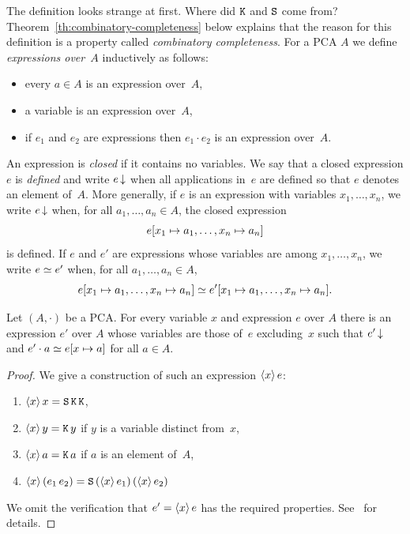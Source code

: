 \noindent
The definition looks strange at first. Where did $\mathtt{K}$ and $\mathtt{S}$
come from? Theorem~\ref{th:combinatory-completeness} below explains
that the reason for this definition is a property called
\emph{combinatory completeness}.
%
For a PCA $A$ we define \emph{expressions over~$A$} inductively as
follows:
%
\begin{itemize}
\item every $a \in A$ is an expression over~$A$,
\item a variable is an expression over~$A$,
\item if $e_1$ and $e_2$ are expressions then $e_1 \cdot e_2$ is an
  expression over~$A$.
\end{itemize}
%
An expression is \emph{closed} if it contains no variables. We say
that a closed expression $e$ is \emph{defined} and write $e\,{\downarrow}$
when all applications in~$e$ are defined so that $e$ denotes an
element of~$A$. More generally, if $e$ is an expression with variables
$x_1, \ldots, x_n$, we write $e\,{\downarrow}$ when, for all $a_1, \ldots,
a_n \in A$, the closed expression
%
\begin{equation*}
  e[x_1 \mapsto a_1, \ldots, x_n \mapsto a_n]
\end{equation*}
%
is defined. If $e$ and $e'$ are expressions whose variables are among
$x_1, \ldots, x_n$, we write $e \simeq e'$ when, for all $a_1, \ldots,
a_n \in A$,
%
\begin{equation*}
  e[x_1 \mapsto a_1, \ldots, x_n \mapsto a_n] \simeq
  e'[x_1 \mapsto a_1, \ldots, x_n \mapsto a_n].
\end{equation*}

\begin{theorem}
  \label{th:combinatory-completeness}
  Let $(A, {\cdot})$ be a PCA. For every variable $x$ and expression
  $e$ over $A$ there is an expression $e'$ over $A$ whose variables
  are those of~$e$ excluding~$x$ such that $e'\,{\downarrow}$ and $e'
  \cdot a \simeq e[x \mapsto a]$ for all $a \in A$.
\end{theorem}

\begin{proof}
  We give a construction of such an expression $\langle x \rangle\,e$:
  \begin{enumerate}
  \item $\langle x \rangle\,x = \mathtt{S}\, \mathtt{K}\, \mathtt{K}$,
  \item $\langle x \rangle\,y = \mathtt{K}\, y$ if $y$ is a variable distinct from~$x$,
  \item $\langle x \rangle\,a = \mathtt{K}\, a$ if $a$ is an element of~$A$,
  \item $\langle x \rangle\,(e_1\, e_2) = \mathtt{S}\, (\langle x \rangle\,e_1)\, (\langle x \rangle\,e_2)$
  \end{enumerate}
  We omit the verification that $e' = \langle x \rangle\,e$ has the required
  properties. See~\cite{LongleyJ:reatls} for details.
\end{proof}

